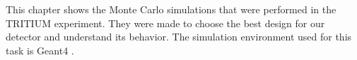 This chapter shows the Monte Carlo simulations that were performed in the TRITIUM experiment. They were made to choose the best design for our detector and understand its behavior. The simulation environment used for this task is Geant4 \cite{Geant4WebPage, Geant4P}.